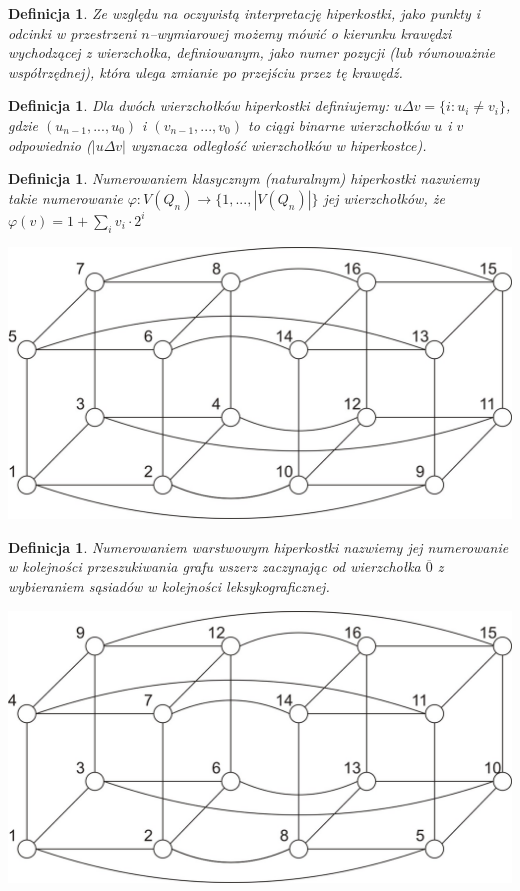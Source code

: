 \documentclass{pracamgr}
\newtheorem{defi}[theorem]{Definicja}
\begin{document}
    \begin{defi}\label{kierunek krawędzi}
     Ze względu na oczywistą interpretację hiperkostki, jako punkty i odcinki w przestrzeni $n$--wymiarowej możemy mówić o \emph{kierunku}
     krawędzi wychodzącej z wierzchołka, definiowanym, jako numer pozycji (lub równoważnie współrzędnej), która ulega zmianie po przejściu przez tę krawędź.
    \end{defi}
    \begin{defi}\label{delta wierzcholkow}
     Dla dwóch wierzchołków hiperkostki definiujemy:
     $u\Delta v=\{i:u_i\neq v_i\}$, gdzie $(u_{n-1},...,u_{0})$ i $(v_{n-1},...,v_{0})$ to ciągi binarne wierzchołków $u$ i $v$ odpowiednio
     ($|u\Delta v|$ wyznacza odległość wierzchołków w hiperkostce).
    \end{defi}
    \begin{defi}\label{numerowanie klasyczne}
     \emph{Numerowaniem klasycznym (naturalnym)} hiperkostki nazwiemy takie numerowanie $\varphi:V(Q_n)\rightarrow\{1,...,|V(Q_n)|\}$ jej wierzchołków, że
     $\varphi(v)=1+\sum_{i}v_i\cdot2^i$
    \end{defi}
    \begin{center}
     \includegraphics[scale=0.6]{img/Q_4_klasyczne.jpg}
    \end{center}
    \begin{defi}\label{numerowanie warstwowe}
     \emph{Numerowaniem warstwowym} hiperkostki nazwiemy jej numerowanie w kolejności przeszukiwania grafu wszerz zaczynając od wierzchołka $\overline{0}$
     z wybieraniem sąsiadów w kolejności leksykograficznej.
    \end{defi}
    \begin{center}
    \includegraphics[scale=0.6]{img/Q_4_warstwowe.jpg}
   \end{center}   
\end{document}
